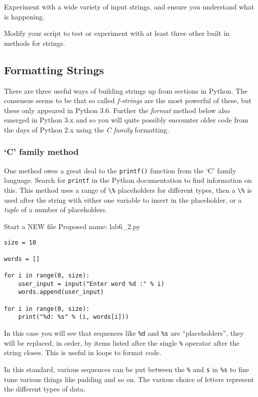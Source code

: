 \documentclass[12pt,oneside]{cttutorial}
\begin{document}
Experiment with a wide variety of input strings, and ensure you understand what is happening.

Modify your script to test or experiment with at least three other built in methods for strings.

\subsection{Formatting Strings}

There are three useful ways of building strings up from sections in Python. The consensus seems to be that so called \emph{f-strings} are the most powerful of these, but these only appeared in Python 3.6. Further the \emph{format} method below also emerged in Python 3.x and so you will quite possibly encounter older code from the days of Python 2.x using the \emph{C family} formatting.

\subsubsection{`C' family method}

One method owes a great deal to the \lstinline!printf()! function from the `C' family language. Search for \lstinline!printf! in the Python documentation to find information on this.
This method uses a range of \lstinline!\%! placeholders for different types, then a \lstinline!\%! is used after the string with either one variable to insert in the placeholder, or a \emph{tuple} of a number of placeholders.

\alert{Start a NEW file}
Proposed name: lab6\_2.py
\begin{lstlisting}
size = 10

words = []

for i in range(0, size):
    user_input = input("Enter word %d :" % i)
    words.append(user_input)

for i in range(0, size):
    print("%d: %s" % (i, words[i]))
\end{lstlisting}

In this case you will see that sequences like \lstinline!%d! and \lstinline!%s! are ``placeholders'', they will be replaced,
in order, by items listed after the single \lstinline!%! operator after the string closes. This is useful in loops to format code.

In this standard, various sequences can be put between the \lstinline!%! and \lstinline!s! in \lstinline!%s! to fine tune various things like padding and so on. The various choice of letters represent the different types of data.
\end{document}
